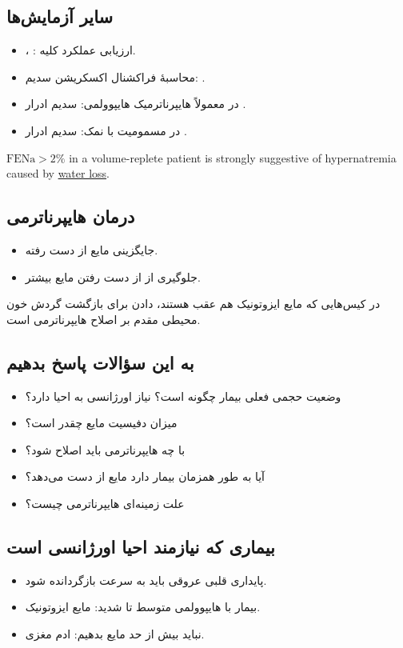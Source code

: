 \documentclass[12pt,a4paper]{article}
\begin{document}
\subsection*{سایر آزمایش‌ها}
\begin{itemize}
\item {}، : ارزیابی عملکرد کلیه.
\item محاسبهٔ فراکشنال اکسکریشن سدیم: .
\item در  معمولاً هایپرناترمیک هایپوولمی: سدیم ادرار .
\item در مسمومیت با نمک: سدیم ادرار .
\end{itemize}
\begin{latin}
\(\mathrm{FENa}>2\%\) in a volume-replete patient is strongly suggestive of hypernatremia caused by \underline{water loss}.
\end{latin}

\subsection*{درمان هایپرناترمی}
\begin{itemize}
\item جایگزینی مایع از دست رفته.
\item جلوگیری از از دست رفتن مایع بیشتر.
\end{itemize}
در کیس‌هایی که مایع ایزوتونیک هم عقب هستند، دادن  برای بازگشت گردش خون محیطی مقدم بر اصلاح هایپرناترمی است.
\subsection*{به این سؤالات پاسخ بدهیم}
\begin{itemize}
\item وضعیت حجمی فعلی بیمار چگونه است؟ نیاز اورژانسی به احیا دارد؟
\item میزان دفیسیت مایع چقدر است؟
\item با چه  هایپرناترمی باید اصلاح شود؟
\item آیا به طور همزمان بیمار دارد مایع از دست می‌دهد؟
\item علت زمینه‌ای هایپرناترمی چیست؟
\end{itemize}
\subsection*{بیماری که نیازمند احیا اورژانسی است}
\begin{itemize}
\item پایداری قلبی عروقی باید به سرعت بازگردانده شود.
\item بیمار با هایپوولمی متوسط تا شدید: مایع ایزوتونیک.
\item نباید بیش از حد مایع بدهیم: ادم مغزی.
\end{itemize}
\end{document}
